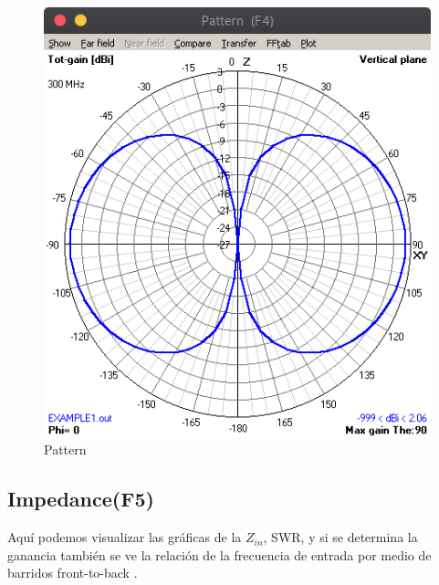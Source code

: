 \documentclass[11pt,a4paper]{article}
\begin{document}
\begin{figure}[H]
    \centering
    \includegraphics[scale=0.35]{images/Interfaz/pattern.png}
    \caption{Pattern}
    \label{fig3:Pattern}
\end{figure}

\subsection{Impedance(F5)}\label{sec:2.4}

Aquí podemos visualizar las gráficas de la $Z_{in}$, SWR, y si se determina la ganancia también se ve la relaci\'on de la frecuencia de entrada por medio de barridos front-to-back  \cite{ant} .
\end{document}
